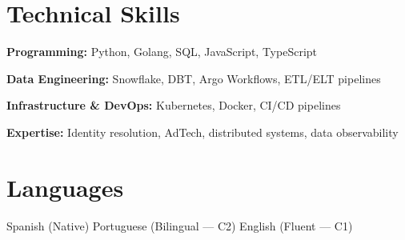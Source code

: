 \documentclass[10pt,a4paper]{article}
\begin{document}
\section*{Technical Skills}

\textbf{Programming:} Python, Golang, SQL, JavaScript, TypeScript

\textbf{Data Engineering:} Snowflake, DBT, Argo Workflows, ETL/ELT pipelines

\textbf{Infrastructure \& DevOps:} Kubernetes, Docker, CI/CD pipelines

\textbf{Expertise:} Identity resolution, AdTech, distributed systems,
data observability

\section*{Languages}

Spanish (Native)
\quad\textperiodcentered\quad Portuguese (Bilingual --- C2)
\quad\textperiodcentered\quad English (Fluent --- C1)
\end{document}
